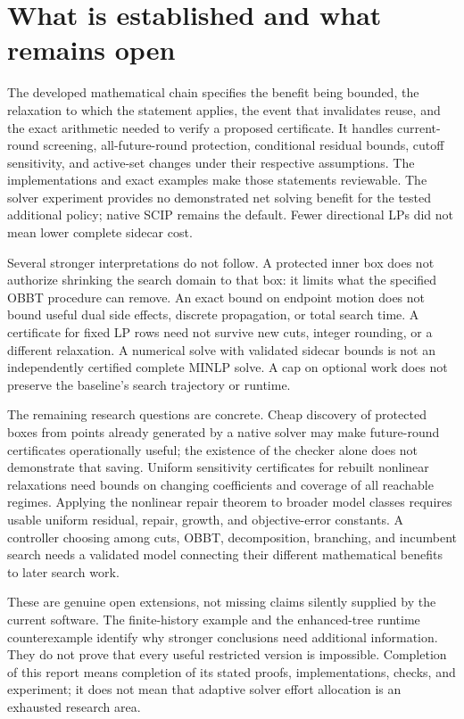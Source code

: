 \section{What is established and what remains open}\label{sec:frontier}

The developed mathematical chain specifies the benefit being bounded,
the relaxation to which the statement applies, the event that invalidates
reuse, and the exact arithmetic needed to verify a proposed certificate.
It handles current-round screening, all-future-round protection,
conditional residual bounds, cutoff sensitivity, and active-set changes
under their respective assumptions. The implementations and exact
examples make those statements reviewable. The solver experiment provides
no demonstrated net solving benefit for the tested additional policy;
native SCIP remains the default. Fewer directional LPs did not mean
lower complete sidecar cost.

Several stronger interpretations do not follow. A protected inner box
does not authorize shrinking the search domain to that box: it limits
what the specified OBBT procedure can remove. An exact bound on endpoint
motion does not bound useful dual side effects, discrete propagation,
or total search time. A certificate for fixed LP rows need not survive
new cuts, integer rounding, or a different relaxation. A numerical solve
with validated sidecar bounds is not an independently certified complete
MINLP solve. A cap on optional work does not preserve the baseline's
search trajectory or runtime.

The remaining research questions are concrete. Cheap discovery of
protected boxes from points already generated by a native solver may
make future-round certificates operationally useful; the existence of
the checker alone does not demonstrate that saving. Uniform sensitivity
certificates for rebuilt nonlinear relaxations need bounds on changing
coefficients and coverage of all reachable regimes. Applying the nonlinear
repair theorem to broader model classes requires usable uniform residual,
repair, growth, and objective-error constants. A controller choosing among cuts, OBBT,
decomposition, branching, and incumbent search needs a validated model
connecting their different mathematical benefits to later search work.

These are genuine open extensions, not missing claims silently supplied
by the current software. The finite-history example and the enhanced-tree
runtime counterexample identify why stronger conclusions need additional
information. They do not prove that every useful restricted version is
impossible. Completion of this report means completion of its stated
proofs, implementations, checks, and experiment; it does not mean that
adaptive solver effort allocation is an exhausted research area.
